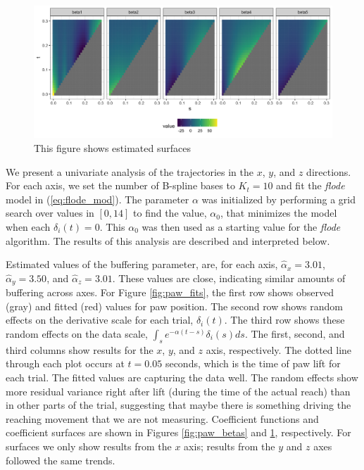 \documentclass[preprint]{JASA}
\begin{document}
\begin{figure}
\includegraphics[width=\reprintcolumnwidth]{../output/fig_data_surfaces-1} \caption{This figure shows estimated surfaces}\label{fig:paw_surfaces}
\end{figure}

We present a univariate analysis of the trajectories in the \(x\),
\(y\), and \(z\) directions. For each axis, we set the number of
B-spline bases to \(K_t = 10\) and fit the \emph{flode} model in
(\ref{eq:flode_mod}). The parameter \(\alpha\) was initialized by
performing a grid search over values in \([0, 14]\) to find the value,
\(\alpha_0\), that minimizes the model when each \(\delta_i(t) = 0\).
This \(\alpha_0\) was then used as a starting value for the \emph{flode}
algorithm. The results of this analysis are described and interpreted
below.

Estimated values of the buffering parameter, are, for each axis,
\(\widehat{\alpha}_x = 3.01\), \(\widehat{\alpha}_y = 3.50\), and
\(\widehat{\alpha}_z = 3.01\). These values are close, indicating
similar amounts of buffering across axes. For Figure \ref{fig:paw_fits},
the first row shows observed (gray) and fitted (red) values for paw
position. The second row shows random effects on the derivative scale
for each trial, \(\delta_i(t)\). The third row shows these random
effects on the data scale, \(\int_s e^{-\alpha (t-s)}\delta_i(s)ds\).
The first, second, and third columns show results for the \(x\), \(y\),
and \(z\) axis, respectively. The dotted line through each plot occurs
at \(t= 0.05\) seconds, which is the time of paw lift for each trial.
The fitted values are capturing the data well. The random effects show
more residual variance right after lift (during the time of the actual
reach) than in other parts of the trial, suggesting that maybe there is
something driving the reaching movement that we are not measuring.
Coefficient functions and coefficient surfaces are shown in Figures
\ref{fig:paw_betas} and \ref{fig:paw_surfaces}, respectively. For
surfaces we only show results from the \(x\) axis; results from the
\(y\) and \(z\) axes followed the same trends.
\end{document}
